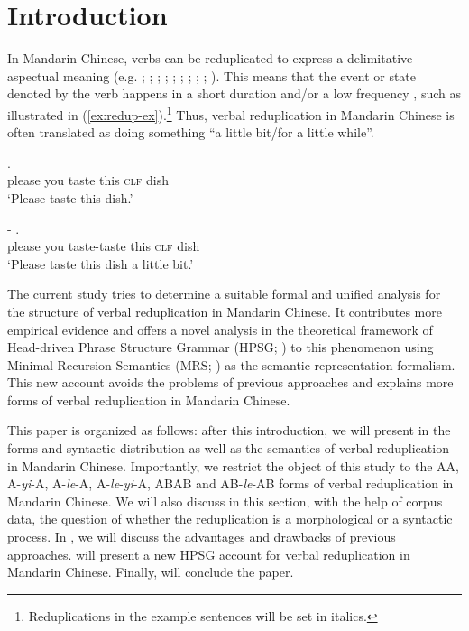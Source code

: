 \section{Introduction}\label{sec:intro}

In Mandarin Chinese, verbs can be reduplicated to express a delimitative aspectual meaning (e.g. \citealt[204--205]{Chao1968}; \citealt[232]{LiThompson1981};  \citealt[14]{Li1996}; \citealt[70]{Dai1997};  \citealt[382--383]{Zhu1998}; \citealt[420--421]{Xing2000}; \citealt[48]{Chen2001};  \citealt[288]{Tsao2001}; \citealt[11--12]{Yang2003}; \citealt[Sec. 4.3]{XiaoMcEnery2004}). 
This means that the event or state denoted by the verb happens in a short duration and/or a low frequency \citep[155]{XiaoMcEnery2004}, such as illustrated in (\ref{ex:redup-ex}).\footnote{Reduplications
    in the example sentences will be set in italics.}
Thus, verbal reduplication in Mandarin Chinese is often translated as doing something ``a little bit/for a little while''.

\ea\label{ex:redup-ex} 
	\ea
	\gll {}     .\\
	please you taste this \textsc{clf} dish\\
	\glt `Please taste this dish.'
	
	\ex
	\gll {}  -   .\\
	please you taste-taste this \textsc{clf} dish\\
	\glt `Please taste this dish a little bit.' 
	\z
\z

The current study tries to determine a suitable formal and unified analysis for the structure of verbal reduplication in Mandarin Chinese.
It contributes more empirical evidence and 
offers a novel analysis in the theoretical framework of Head-driven Phrase Structure Grammar (HPSG; \citealt{PollardSag1994, Sag1997, HPSGHandbook}) to this phenomenon 
using Minimal Recursion Semantics (MRS; \citealt{Copestakeetal2005}) as the semantic representation formalism.
This new account avoids the problems of previous approaches and
explains more forms of verbal reduplication in Mandarin Chinese.

This paper is organized as follows: 
after this introduction, we will present in  the forms and syntactic distribution as well as the semantics of verbal reduplication in Mandarin Chinese. 
Importantly, we restrict the object of this study to the AA, A-\textit{yi}-A, A-\textit{le}-A, A-\textit{le}-\textit{yi}-A, ABAB and AB-\textit{le}-AB forms of verbal reduplication in Mandarin Chinese.
We will also discuss in this section, with the help of corpus data, the question of whether the reduplication is a morphological or a syntactic process.
In , we will discuss the advantages and drawbacks of previous approaches. 
 will present a new {HPSG} account for verbal reduplication in Mandarin Chinese.
Finally,   will conclude the paper.


